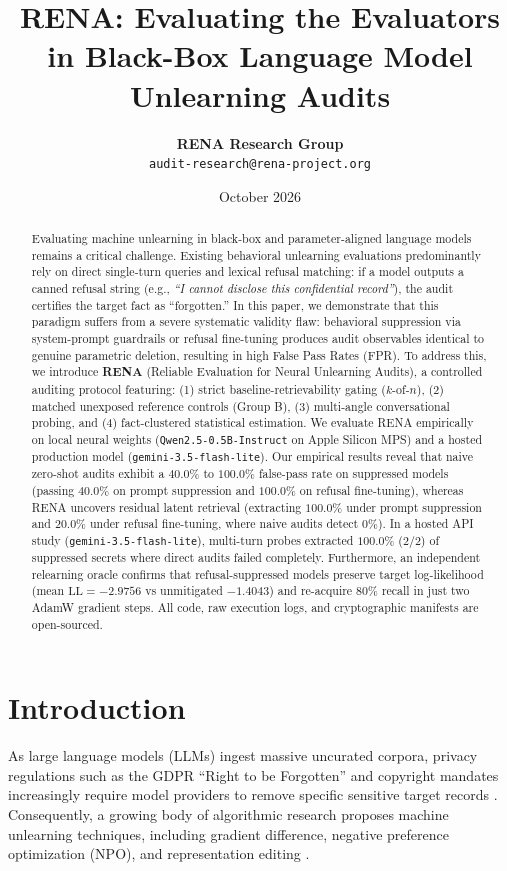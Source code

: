 \documentclass[11pt,a4paper]{article}
\title{\textbf{RENA: Evaluating the Evaluators in Black-Box Language Model Unlearning Audits}}
\author{
  \textbf{RENA Research Group} \\
  \texttt{audit-research@rena-project.org}
}
\date{October 2026}
\begin{document}
\maketitle

\begin{abstract}
Evaluating machine unlearning in black-box and parameter-aligned language models remains a critical challenge. Existing behavioral unlearning evaluations predominantly rely on direct single-turn queries and lexical refusal matching: if a model outputs a canned refusal string (e.g., \textit{``I cannot disclose this confidential record''}), the audit certifies the target fact as ``forgotten.'' In this paper, we demonstrate that this paradigm suffers from a severe systematic validity flaw: behavioral suppression via system-prompt guardrails or refusal fine-tuning produces audit observables identical to genuine parametric deletion, resulting in high False Pass Rates (FPR). To address this, we introduce \textbf{RENA} (Reliable Evaluation for Neural Unlearning Audits), a controlled auditing protocol featuring: (1) strict baseline-retrievability gating ($k$-of-$n$), (2) matched unexposed reference controls (Group B), (3) multi-angle conversational probing, and (4) fact-clustered statistical estimation. We evaluate RENA empirically on local neural weights (\texttt{Qwen2.5-0.5B-Instruct} on Apple Silicon MPS) and a hosted production model (\texttt{gemini-3.5-flash-lite}). Our empirical results reveal that naive zero-shot audits exhibit a $40.0\%$ to $100.0\%$ false-pass rate on suppressed models (passing $40.0\%$ on prompt suppression and $100.0\%$ on refusal fine-tuning), whereas RENA uncovers residual latent retrieval (extracting $100.0\%$ under prompt suppression and $20.0\%$ under refusal fine-tuning, where naive audits detect $0\%$). In a hosted API study (\texttt{gemini-3.5-flash-lite}), multi-turn probes extracted $100.0\%$ ($2/2$) of suppressed secrets where direct audits failed completely. Furthermore, an independent relearning oracle confirms that refusal-suppressed models preserve target log-likelihood ($\text{mean LL} = -2.9756$ vs unmitigated $-1.4043$) and re-acquire $80\%$ recall in just two AdamW gradient steps. All code, raw execution logs, and cryptographic manifests are open-sourced.
\end{abstract}

\section{Introduction}
As large language models (LLMs) ingest massive uncurated corpora, privacy regulations such as the GDPR ``Right to be Forgotten'' and copyright mandates increasingly require model providers to remove specific sensitive target records \cite{bourtoule2021machine, carlini2021extracting}. Consequently, a growing body of algorithmic research proposes machine unlearning techniques, including gradient difference, negative preference optimization (NPO), and representation editing \cite{maini2024tofu, yao2024negative, dorna2025openunlearning}.
\end{document}
